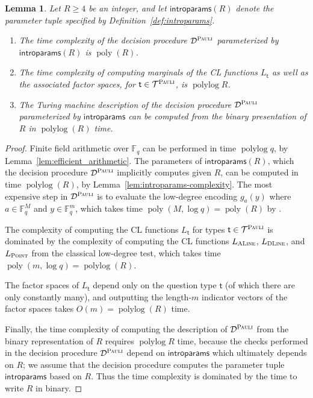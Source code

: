 \documentclass[11pt]{article}
\newtheorem{lemma}[theorem]{Lemma}
\theoremstyle{definition}
\newcommand{\F}{\ensuremath{\mathbb{F}}}
\DeclareMathOperator{\poly}{poly}
\DeclareMathOperator{\polylog}{polylog}
\newcommand{\decider}{\mathcal{D}}
\newcommand{\type}{\mathcal{T}}
\newcommand{\gamestyle}[1]{\ensuremath{\textsc{#1}}\xspace}
\newcommand{\pauli}{\gamestyle{Pauli}}
\newcommand{\tvarstyle}[1]{\mathsf{#1}}
\newcommand{\tvar}{\ensuremath{\tvarstyle{t}}}
\newcommand{\typestyle}[1]{\ensuremath{\textsc{#1}}\xspace}
\newcommand{\Point}{\typestyle{Point}}
\newcommand{\ALine}{\typestyle{ALine}}
\newcommand{\DLine}{\typestyle{DLine}}
\newcommand{\introparams}{\mathsf{introparams}}
\begin{document}
\begin{lemma}
  \label{lem:qld-complexity}
  Let $R \geq 4$ be an integer, and let $\introparams(R)$ denote the parameter tuple
  specified by Definition~\ref{def:introparams}.
  \begin{enumerate}
	\item The time complexity of the decision procedure $\decider^\pauli$
    parameterized by $\introparams(R)$ is $\poly(R)$.
	\item The time complexity of computing marginals of the CL functions $L_\tvar$
    as well as the associated factor spaces, for $\tvar \in \type^\pauli$, is
    $\polylog R$.
	\item The Turing machine description of the decision procedure
    $\decider^\pauli$ parameterized by $\introparams$ can be computed from the
    binary presentation of $R$ in $\polylog (R)$ time.
  \end{enumerate}
\end{lemma}

\begin{proof}
	Finite field arithmetic over $\F_q$ can be performed in time $\polylog q$, by
  Lemma~\ref{lem:efficient_arithmetic}.
  The parameters of $\introparams(R)$, which the decision procedure
  $\decider^\pauli$ implicitly computes given $R$, can be computed in time
  $\polylog(R)$, by Lemma~\ref{lem:introparams-complexity}.
  The most expensive step in $\decider^\pauli$ is to evaluate the low-degree
  encoding $g_{a}(y)$ where $a \in \F_q^M$ and $y \in \F_q^m$, which
  takes time $\poly(M,\log q) = \poly(R)$ by .
	
  The complexity of computing the CL functions $L_\tvar$ for types $\tvar \in
  \type^\pauli$ is dominated by the complexity of computing the CL functions
  $L_\ALine$, $L_\DLine$, and $L_\Point$ from the classical low-degree test, which takes time
  $\poly(m, \log q) = \polylog(R)$.

  The factor spaces of $L_\tvar$ depend only on the question type $\tvar$ (of
  which there are only constantly many), and outputting the length-$m$ indicator
  vectors of the factor spaces takes $O(m) = \polylog (R)$ time.

  Finally, the time complexity of computing the description of $\decider^\pauli$
  from the binary representation of $R$ requires $\polylog R$ time, because the
  checks performed in the decision procedure $\decider^\pauli$ depend on
  $\introparams$ which ultimately depends on $R$; we assume that the decision
  procedure computes the parameter tuple $\introparams$ based on $R$.
  Thus the time complexity is dominated by the time to write $R$ in binary.
\end{proof}
 
\end{document}
